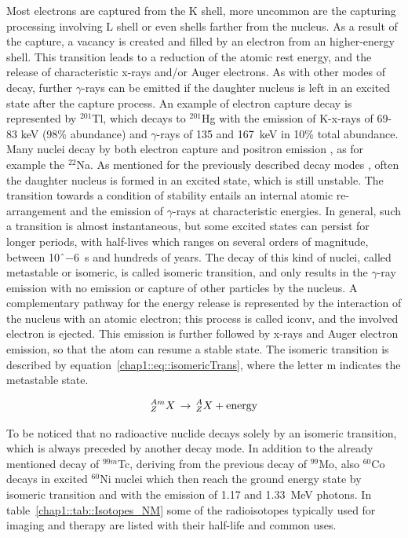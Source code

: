 Most electrons are captured from the K shell, more uncommon are the capturing processing involving L shell or even shells farther from the nucleus. As a result of the capture, a vacancy is created and filled by an electron from an higher-energy shell. This transition leads to a reduction of the atomic rest energy, and the release of characteristic x-rays and/or Auger electrons. As with other modes of decay, further $\gamma$-rays can be emitted if the daughter nucleus is left in an excited state after the capture process. An example of electron capture decay is represented by $^{201}$Tl, which decays to $^{201}$Hg with the emission of K-x-rays of 69-83 keV (98\% abundance) and $\gamma$-rays of 135 and 167~keV in 10\% total abundance. Many nuclei decay by both electron capture and positron emission , as for example the $^{22}$Na.
As mentioned for the previously described decay modes , often the daughter nucleus is formed in an excited state, which is still unstable. The transition towards a condition of stability entails an internal atomic re-arrangement and the emission of $\gamma$-rays at characteristic energies. In general, such a transition is almost instantaneous, but some excited states can persist for longer periods, with half-lives which ranges on several orders of magnitude, between 10$ˆ{-6}$~s and hundreds of years. The decay of this kind of nuclei, called metastable or isomeric, is called isomeric transition, and only results in the $\gamma$-ray emission with no emission or capture of other particles by the nucleus. A complementary pathway for the energy release is represented by the interaction of the nucleus with an atomic electron; this process is called \gls{iconv}, and the involved electron is ejected. This emission is further followed by x-rays and Auger electron emission, so that the atom can resume a stable state. The isomeric transition is described by equation~\ref{chap1::eq::isomericTrans}, where the letter m indicates the metastable state.

 \begin{equation}\label{chap1::eq::isomericTrans}
^{Am}_{Z}X  \, \rightarrow \, ^{A}_{Z}X  + \mathrm{energy} \\
\end{equation}        

To be noticed that no radioactive nuclide decays solely by an isomeric transition, which is always preceded by another decay mode. In addition to the already mentioned decay of $^{99m}$Tc, deriving from the previous decay of $^{99}$Mo, also $^{60}$Co decays in excited $^{60}$Ni nuclei which then reach the ground energy state by isomeric transition and with the emission of 1.17 and 1.33~MeV photons. 
In table~\ref{chap1::tab::Isotopes_NM} some of the radioisotopes typically used for imaging and therapy are listed with their half-life and common uses. 


